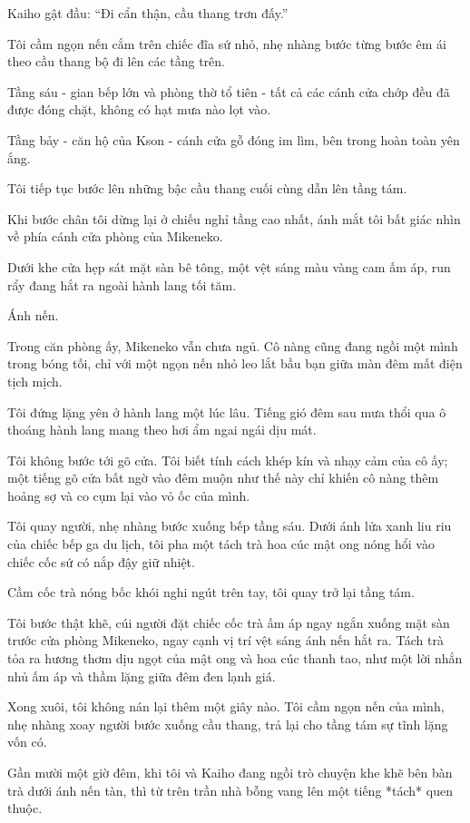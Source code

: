 \documentclass[../main.tex]{subfiles}
\begin{document}
Kaiho gật đầu: ``Đi cẩn thận, cầu thang trơn đấy.''

Tôi cầm ngọn nến cắm trên chiếc đĩa sứ nhỏ, nhẹ nhàng bước từng bước êm ái theo cầu thang bộ đi lên các tầng trên.

Tầng sáu - gian bếp lớn và phòng thờ tổ tiên - tất cả các cánh cửa chớp đều đã được đóng chặt, không có hạt mưa nào lọt vào.

Tầng bảy - căn hộ của Kson - cánh cửa gỗ đóng im lìm, bên trong hoàn toàn yên ắng.

Tôi tiếp tục bước lên những bậc cầu thang cuối cùng dẫn lên tầng tám.

Khi bước chân tôi dừng lại ở chiếu nghỉ tầng cao nhất, ánh mắt tôi bất giác nhìn về phía cánh cửa phòng của Mikeneko.

Dưới khe cửa hẹp sát mặt sàn bê tông, một vệt sáng màu vàng cam ấm áp, run rẩy đang hắt ra ngoài hành lang tối tăm.

Ánh nến.

Trong căn phòng ấy, Mikeneko vẫn chưa ngủ. Cô nàng cũng đang ngồi một mình trong bóng tối, chỉ với một ngọn nến nhỏ leo lắt bầu bạn giữa màn đêm mất điện tịch mịch.

Tôi đứng lặng yên ở hành lang một lúc lâu. Tiếng gió đêm sau mưa thổi qua ô thoáng hành lang mang theo hơi ẩm ngai ngái dịu mát.

Tôi không bước tới gõ cửa. Tôi biết tính cách khép kín và nhạy cảm của cô ấy; một tiếng gõ cửa bất ngờ vào đêm muộn như thế này chỉ khiến cô nàng thêm hoảng sợ và co cụm lại vào vỏ ốc của mình.

Tôi quay người, nhẹ nhàng bước xuống bếp tầng sáu. Dưới ánh lửa xanh liu riu của chiếc bếp ga du lịch, tôi pha một tách trà hoa cúc mật ong nóng hổi vào chiếc cốc sứ có nắp đậy giữ nhiệt.

Cầm cốc trà nóng bốc khói nghi ngút trên tay, tôi quay trở lại tầng tám.

Tôi bước thật khẽ, cúi người đặt chiếc cốc trà ấm áp ngay ngắn xuống mặt sàn trước cửa phòng Mikeneko, ngay cạnh vị trí vệt sáng ánh nến hắt ra. Tách trà tỏa ra hương thơm dịu ngọt của mật ong và hoa cúc thanh tao, như một lời nhắn nhủ ấm áp và thầm lặng giữa đêm đen lạnh giá.

Xong xuôi, tôi không nán lại thêm một giây nào. Tôi cầm ngọn nến của mình, nhẹ nhàng xoay người bước xuống cầu thang, trả lại cho tầng tám sự tĩnh lặng vốn có.

\ct

Gần mười một giờ đêm, khi tôi và Kaiho đang ngồi trò chuyện khe khẽ bên bàn trà dưới ánh nến tàn, thì từ trên trần nhà bỗng vang lên một tiếng *tách* quen thuộc.
\end{document}
